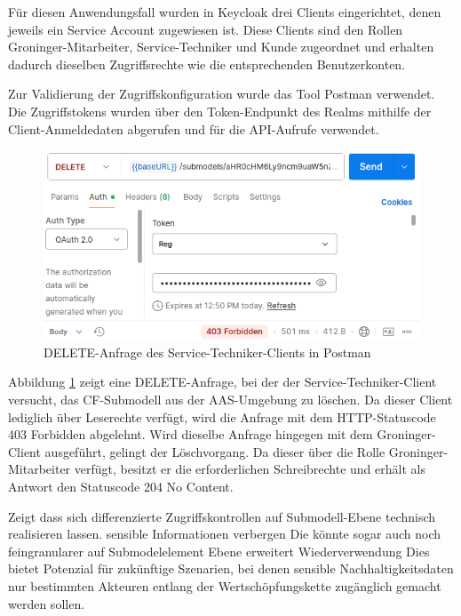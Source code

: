 Für diesen Anwendungsfall wurden in Keycloak drei Clients eingerichtet, denen jeweils ein Service Account zugewiesen ist. 
Diese Clients sind den Rollen Groninger-Mitarbeiter, Service-Techniker und Kunde zugeordnet und erhalten dadurch dieselben Zugriffsrechte wie die entsprechenden Benutzerkonten. 

Zur Validierung der Zugriffskonfiguration wurde das Tool Postman verwendet. 
Die Zugriffstokens wurden über den Token-Endpunkt des Realms mithilfe der Client-Anmeldedaten abgerufen und für die API-Aufrufe verwendet.

\begin{figure}[htbp]
    \centering
        \includegraphics{Bilder/Ergebnisse/DPP/Postman/TechnicianDelet.png}
    \caption{DELETE-Anfrage des Service-Techniker-Clients in Postman}
    \label{fig:KeycloakAnmeldeSeite}
\end{figure}

Abbildung \ref{fig:KeycloakAnmeldeSeite} zeigt eine DELETE-Anfrage, bei der der Service-Techniker-Client versucht, das CF-Submodell aus der AAS-Umgebung zu löschen. 
Da dieser Client lediglich über Leserechte verfügt, wird die Anfrage mit dem HTTP-Statuscode 403 Forbidden abgelehnt.
Wird dieselbe Anfrage hingegen mit dem Groninger-Client ausgeführt, gelingt der Löschvorgang. 
Da dieser über die Rolle Groninger-Mitarbeiter verfügt, besitzt er die erforderlichen Schreibrechte und erhält als Antwort den Statuscode 204 No Content.

Zeigt dass sich differenzierte Zugriffskontrollen auf Submodell-Ebene technisch realisieren lassen.
sensible Informationen verbergen
Die könnte sogar auch noch feingranularer auf Submodelelement Ebene erweitert Wiederverwendung
Dies bietet Potenzial für zukünftige Szenarien, bei denen sensible Nachhaltigkeitsdaten nur bestimmten Akteuren entlang der Wertschöpfungskette zugänglich gemacht werden sollen.

